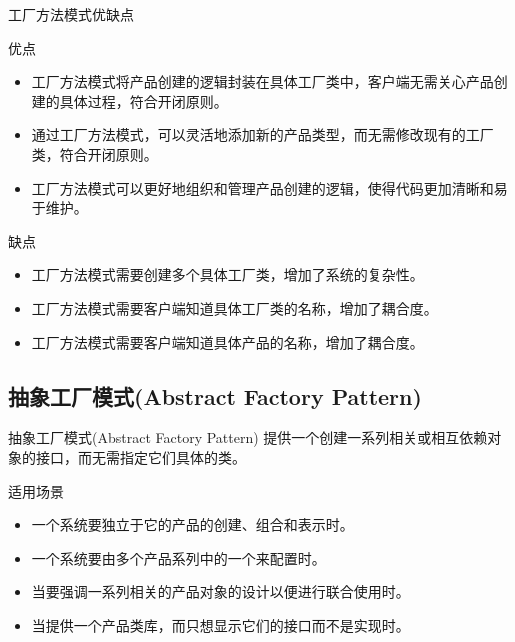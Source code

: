 \documentclass[UTF8,aspectratio=169]{beamer}
\begin{document}
\begin{frame}{工厂方法模式优缺点}
    \begin{ytublock}{优点}
        \begin{itemize}
            \item 工厂方法模式将产品创建的逻辑封装在具体工厂类中，客户端无需关心产品创建的具体过程，符合开闭原则。
            \item 通过工厂方法模式，可以灵活地添加新的产品类型，而无需修改现有的工厂类，符合开闭原则。
            \item 工厂方法模式可以更好地组织和管理产品创建的逻辑，使得代码更加清晰和易于维护。
        \end{itemize}
    \end{ytublock}
    \begin{alertytublock}{缺点}
        \begin{itemize}
            \item 工厂方法模式需要创建多个具体工厂类，增加了系统的复杂性。
            \item 工厂方法模式需要客户端知道具体工厂类的名称，增加了耦合度。
            \item 工厂方法模式需要客户端知道具体产品的名称，增加了耦合度。
        \end{itemize}
    \end{alertytublock}
\end{frame}

\subsection{抽象工厂模式(Abstract Factory Pattern)}

\begin{frame}{抽象工厂模式(Abstract Factory Pattern)}
    提供一个创建一系列相关或相互依赖对象的接口，而无需指定它们具体的类。
    \begin{ytublock}{适用场景}
        \begin{itemize}
            \item 一个系统要独立于它的产品的创建、组合和表示时。
            \item 一个系统要由多个产品系列中的一个来配置时。
            \item 当要强调一系列相关的产品对象的设计以便进行联合使用时。
            \item 当提供一个产品类库，而只想显示它们的接口而不是实现时。
        \end{itemize}
    \end{ytublock}
\end{frame}
\end{document}
